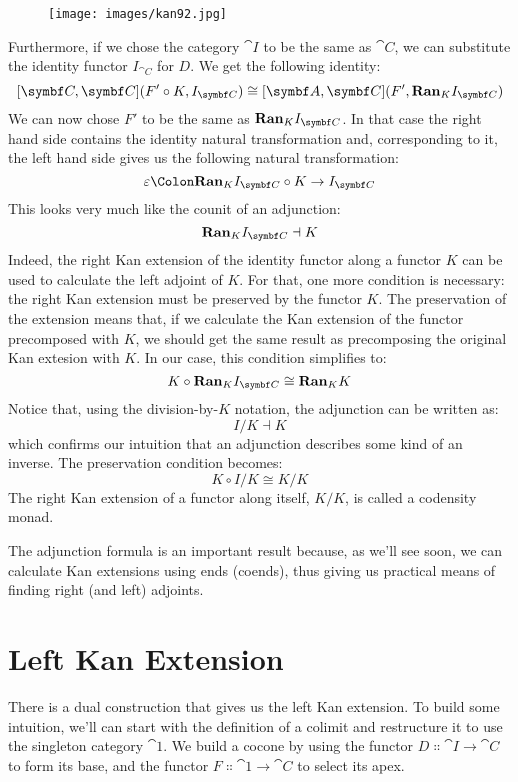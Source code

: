 \begin{figure}[H]
\centering
\texttt{[image: images/kan92.jpg]}
\end{figure}

\noindent
Furthermore, if we chose the category $\cat{I}$ to be the same as
$\cat{C}$, we can substitute the identity functor $I_{\cat{C}}$ for
$D$. We get the following identity:
\[[\cat{C}, \cat{C}](F' \circ K, I_{\cat{C}}) \cong [\cat{A}, \cat{C}](F', \Ran_{K}I_{\cat{C}})\]
We can now chose $F'$ to be the same as $\Ran_{K}I_{\cat{C}}$. In
that case the right hand side contains the identity natural
transformation and, corresponding to it, the left hand side gives us the
following natural transformation:
\[\varepsilon \Colon \Ran_{K}I_{\cat{C}} \circ K \to I_{\cat{C}}\]
This looks very much like the counit of an adjunction:
\[\Ran_{K}I_{\cat{C}} \dashv K\]
Indeed, the right Kan extension of the identity functor along a functor
$K$ can be used to calculate the left adjoint of $K$. For
that, one more condition is necessary: the right Kan extension must be
preserved by the functor $K$. The preservation of the extension
means that, if we calculate the Kan extension of the functor precomposed
with $K$, we should get the same result as precomposing the
original Kan extesion with $K$. In our case, this condition
simplifies to:
\[K \circ \Ran_{K}I_{\cat{C}} \cong \Ran_{K}K\]
Notice that, using the division-by-$K$ notation, the adjunction can be
written as:
\[I/K \dashv K\]
which confirms our intuition that an adjunction describes some kind of
an inverse. The preservation condition becomes:
\[K \circ I/K \cong K/K\]
The right Kan extension of a functor along itself, $K/K$, is
called a codensity monad.

The adjunction formula is an important result because, as we'll see
soon, we can calculate Kan extensions using ends (coends), thus giving
us practical means of finding right (and left) adjoints.

\section{Left Kan Extension}

There is a dual construction that gives us the left Kan extension. To
build some intuition, we'll can start with the definition of a colimit
and restructure it to use the singleton category $\cat{1}$. We build a
cocone by using the functor $D \Colon \cat{I} \to \cat{C}$ to form its
base, and the functor $F \Colon \cat{1} \to \cat{C}$ to select its apex.

